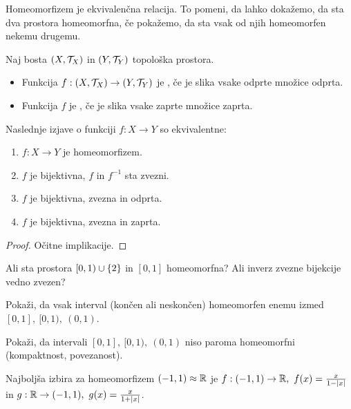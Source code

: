 \begin{opomba}
    Homeomorfizem je ekvivalenčna relacija. To pomeni, da lahko dokažemo, da sta dva prostora homeomorfna, če pokažemo, da sta vsak od njih homeomorfen nekemu drugemu.
\end{opomba}

\begin{definicija}
    Naj bosta $(X, \mathcal{T}_X)$ in $(Y, \mathcal{T}_Y)$ topološka prostora.
    \begin{itemize}
        \item Funkcija $f: (X, \mathcal{T}_X) \to (Y, \mathcal{T}_Y)$ je , če je slika vsake odprte množice odprta.
        \item Funkcija $f$ je , če je slika vsake zaprte množice zaprta.
    \end{itemize}     
\end{definicija}

\begin{trditev}
    Naslednje izjave o funkciji $f: X \to Y$ so ekvivalentne:
    \begin{enumerate}
        \item $f: X \to Y$ je homeomorfizem.
        \item $f$ je bijektivna, $f$ in $f^{-1}$ sta zvezni.
        \item $f$ je bijektivna, zvezna in odprta.
        \item $f$ je bijektivna, zvezna in zaprta.
    \end{enumerate}
\end{trditev}

\begin{proof}
    Očitne implikacije.
\end{proof}

\begin{primer} 
    Ali sta prostora $[0, 1) \cup \left\{2\right\}$ in $[0,1]$ homeomorfna? Ali inverz zvezne bijekcije vedno zvezen?
\end{primer}

\begin{primer}
    Pokaži, da vsak interval (končen ali neskončen) homeomorfen enemu izmed $[0,1], \ [0, 1), \ (0,1)$.

    Pokaži, da intervali $[0,1], \ [0, 1), \ (0,1)$ niso paroma homeomorfni  (kompaktnost, povezanost).
\end{primer}

\begin{primer}
    Najboljša izbira za homeomorfizem $(-1, 1) \approx \mathbb{R}$ je $f: (-1, 1) \to \R, \ f(x) = \frac{x}{1 - |x|}$ in $g: \mathbb{R} \to (-1, 1), \ g(x) = \frac{x}{1+|x|}$.
\end{primer}

